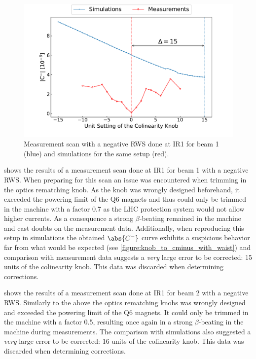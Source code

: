 \begin{figure}[!htb]
    \centering
    \includegraphics*[width=\textwidth]{Figures/IR_Coupling_Correction/rws_measurement_ir1_b1_neg.pdf}
    \caption{Measurement scan with a negative RWS done at IR\num{1} for beam \num{1} (\textcolor{mplblue}{blue}) and simulations for the same setup (\textcolor{mplr}{red}).}
    \label{figure:ir1_b1_neg_measurement}
\end{figure}

 shows the results of a measurement scan done at IR\num{1} for beam \num{1} with a negative RWS.
When preparing for this scan an issue was encountered when trimming in the optics rematching knob.
As the knob was wrongly designed beforehand, it exceeded the powering limit of the Q\num{6} magnets and thus could only be trimmed in the machine with a factor \num{0.7} as the LHC protection system would not allow higher currents.
As a consequence a strong \(\beta\)-beating remained in the machine and cast doubts on the measurement data. 
Additionally, when reproducing this setup in simulations the obtained \(\abs{C^{-}}\) curve exhibits a suspicious behavior far from what would be expected (see \cref{figure:knob_to_cminus_with_waist}) and comparison with measurement data suggests a \textit{very} large error to be corrected: \num{15} units of the colinearity knob.
This data was discarded when determining corrections.

 shows the results of a measurement scan done at IR\num{1} for beam \num{2} with a negative RWS.
Similarly to the above the optics rematching knobs was wrongly designed and exceeded the powering limit of the Q\num{6} magnets.
It could only be trimmed in the machine with a factor \num{0.5}, resulting once again in a strong \(\beta\)-beating in the machine during measurements.
The comparison with simulations also suggested a \textit{very} large error to be corrected: \num{16} units of the colinearity knob.
This data was discarded when determining corrections.

